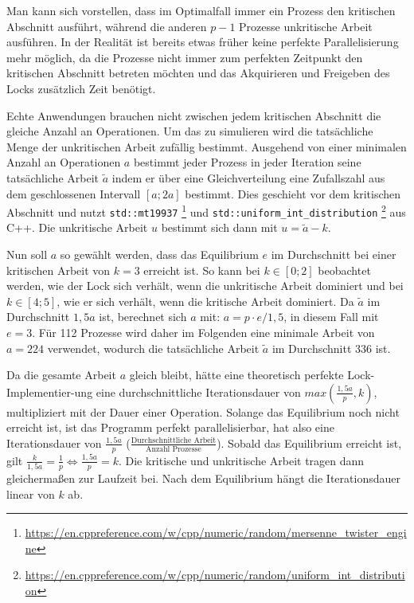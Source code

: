 Man kann sich vorstellen,
dass im Optimalfall immer ein Prozess den kritischen Abschnitt ausführt,
während die anderen $p - 1$ Prozesse unkritische Arbeit ausführen.
In der Realität ist bereits etwas früher keine perfekte Parallelisierung mehr möglich,
da die Prozesse nicht immer zum perfekten Zeitpunkt den kritischen Abschnitt betreten möchten
und das Akquirieren und Freigeben des Locks zusätzlich Zeit benötigt.

Echte Anwendungen brauchen nicht zwischen jedem kritischen Abschnitt die gleiche Anzahl an Operationen.
Um das zu simulieren wird die tatsächliche Menge der unkritischen Arbeit zufällig bestimmt.
Ausgehend von einer minimalen Anzahl an Operationen $a$ bestimmt jeder Prozess in jeder Iteration
seine tatsächliche Arbeit $\tilde{a}$ indem er über eine Gleichverteilung eine Zufallszahl aus dem geschlossenen Intervall $[a; 2a]$ bestimmt.
Dies geschieht vor dem kritischen Abschnitt und nutzt \texttt{std::mt19937}%
\footnote{\url{https://en.cppreference.com/w/cpp/numeric/random/mersenne_twister_engine}}
und \texttt{std::uniform\_int\_distribution}%
\footnote{\url{https://en.cppreference.com/w/cpp/numeric/random/uniform_int_distribution}}
aus C++.
Die unkritische Arbeit $u$ bestimmt sich dann mit $u = \tilde{a} - k$.

Nun soll $a$ so gewählt werden,
dass das Equilibrium $e$ im Durchschnitt bei einer kritischen Arbeit von $k = 3$ erreicht ist.
So kann bei $k \in [0; 2]$ beobachtet werden,
wie der Lock sich verhält,
wenn die unkritische Arbeit dominiert
und bei $k \in [4; 5]$,
wie er sich verhält,
wenn die kritische Arbeit dominiert.
Da $\tilde{a}$ im Durchschnitt $1,5a$ ist,
berechnet sich $a$ mit: $a = p \cdot e / 1,5$,
in diesem Fall mit $e = 3$.
Für 112 Prozesse wird daher im Folgenden eine minimale Arbeit von $a = 224$ verwendet,
wodurch die tatsächliche Arbeit $\tilde{a}$ im Durchschnitt 336 ist.

Da die gesamte Arbeit $a$ gleich bleibt,
hätte eine theoretisch perfekte Lock-Implementier-ung
eine durchschnittliche Iterationsdauer von $max(\frac{1,5a}{p}, k)$,
multipliziert mit der Dauer einer Operation.
Solange das Equilibrium noch nicht erreicht ist,
ist das Programm perfekt parallelisierbar,
hat also eine Iterationsdauer von $\frac{1,5a}{p}$ ($\frac{\text{Durchschnittliche Arbeit}}{\text{Anzahl Prozesse}}$).
Sobald das Equilibrium erreicht ist,
gilt $\frac{k}{1,5a} = \frac{1}{p} \iff \frac{1,5a}{p} = k$.
Die kritische und unkritische Arbeit tragen dann gleichermaßen zur Laufzeit bei.
Nach dem Equilibrium hängt die Iterationsdauer linear von $k$ ab.

